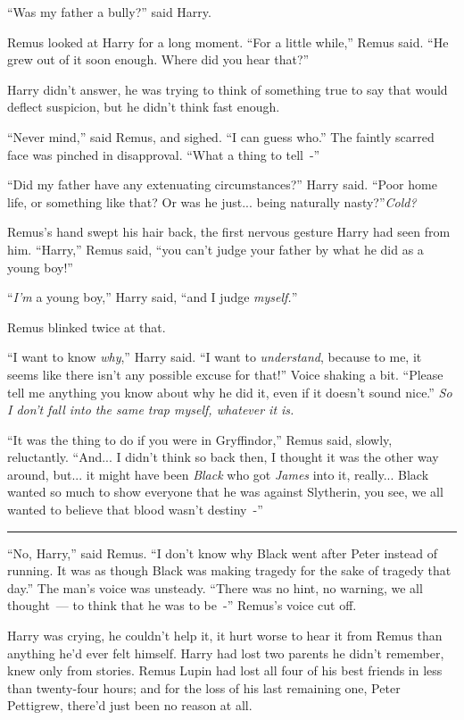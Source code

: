 ``Was my father a bully?'' said Harry.

Remus looked at Harry for a long moment. ``For a little while,'' Remus said. ``He grew out of it soon enough. Where did you hear that?''

Harry didn't answer, he was trying to think of something true to say that would deflect suspicion, but he didn't think fast enough.

``Never mind,'' said Remus, and sighed. ``I can guess who.'' The faintly scarred face was pinched in disapproval. ``What a thing to tell~-''

``Did my father have any extenuating circumstances?'' Harry said. ``Poor home life, or something like that? Or was he just... being naturally nasty?''\emph{Cold?}

Remus's hand swept his hair back, the first nervous gesture Harry had seen from him. ``Harry,'' Remus said, ``you can't judge your father by what he did as a young boy!''

``\emph{I'm} a young boy,'' Harry said, ``and I judge \emph{myself.}''

Remus blinked twice at that.

``I want to know \emph{why},'' Harry said. ``I want to \emph{understand}, because to me, it seems like there isn't any possible excuse for that!'' Voice shaking a bit. ``Please tell me anything you know about why he did it, even if it doesn't sound nice.'' \emph{So I don't fall into the same trap myself, whatever it is.}

``It was the thing to do if you were in Gryffindor,'' Remus said, slowly, reluctantly. ``And... I didn't think so back then, I thought it was the other way around, but... it might have been \emph{Black} who got \emph{James} into it, really... Black wanted so much to show everyone that he was against Slytherin, you see, we all wanted to believe that blood wasn't destiny~-''

\begin{center}\rule{3in}{0.4pt}\end{center}

``No, Harry,'' said Remus. ``I don't know why Black went after Peter instead of running. It was as though Black was making tragedy for the sake of tragedy that day.'' The man's voice was unsteady. ``There was no hint, no warning, we all thought~--- to think that he was to be~-'' Remus's voice cut off.

Harry was crying, he couldn't help it, it hurt worse to hear it from Remus than anything he'd ever felt himself. Harry had lost two parents he didn't remember, knew only from stories. Remus Lupin had lost all four of his best friends in less than twenty-four hours; and for the loss of his last remaining one, Peter Pettigrew, there'd just been no reason at all.

